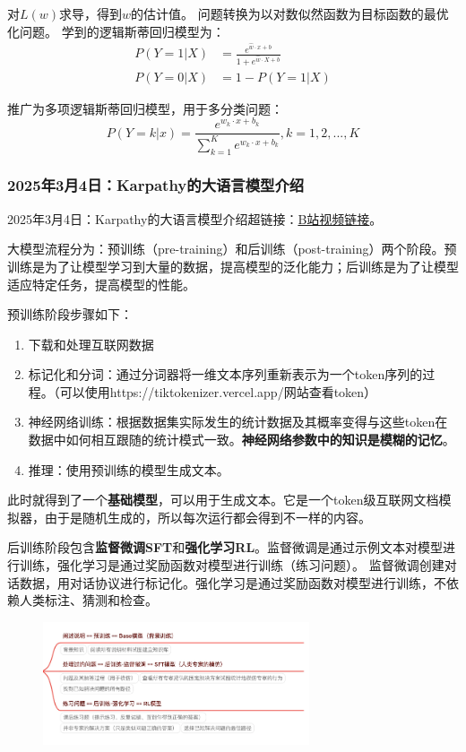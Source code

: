 \documentclass[12pt]{article}
\begin{document}
对$L(w)$求导，得到$w$的估计值。
问题转换为以对数似然函数为目标函数的最优化问题。
学到的逻辑斯蒂回归模型为：
\begin{align*}
    P(Y=1|X) &= \frac{ e^{\hat{w} \cdot x + b} }{1 + e^{\hat{w} \cdot X + b}} \\
    P(Y=0|X) &= 1 - P(Y=1|X)
\end{align*}

推广为多项逻辑斯蒂回归模型，用于多分类问题：
$$
P(Y=k|x) = \frac {e^{w_k \cdot x + b_k}}{\sum_{k=1}^{K} e^{w_k \cdot x + b_k}} , k = 1,2,...,K
$$

\subsubsection{2025年3月4日：Karpathy的大语言模型介绍}
2025年3月4日：Karpathy的大语言模型介绍超链接：\href{https://www.bilibili.com/video/BV16cNEeXEer/?spm_id_from=333.337.search-card.all.click&vd_source=13dfbe5ed2deada83969fafa995ccff6}{B站视频链接}。

大模型流程分为：预训练（pre-training）和后训练（post-training）两个阶段。预训练是为了让模型学习到大量的数据，提高模型的泛化能力；后训练是为了让模型适应特定任务，提高模型的性能。

预训练阶段步骤如下：
\begin{enumerate}
    \item 下载和处理互联网数据
    \item 标记化和分词：通过分词器将一维文本序列重新表示为一个token序列的过程。（可以使用https://tiktokenizer.vercel.app/网站查看token）
    \item 神经网络训练：根据数据集实际发生的统计数据及其概率变得与这些token在数据中如何相互跟随的统计模式一致。\textbf{神经网络参数中的知识是模糊的记忆}。
    \item 推理：使用预训练的模型生成文本。
\end{enumerate}
此时就得到了一个\textbf{基础模型}，可以用于生成文本。它是一个token级互联网文档模拟器，由于是随机生成的，所以每次运行都会得到不一样的内容。

后训练阶段包含\textbf{监督微调SFT}和\textbf{强化学习RL}。监督微调是通过示例文本对模型进行训练，强化学习是通过奖励函数对模型进行训练（练习问题）。
监督微调创建对话数据，用对话协议进行标记化。强化学习是通过奖励函数对模型进行训练，不依赖人类标注、猜测和检查。

\begin{figure}[h]
    \centering
    \includegraphics[width=0.7\textwidth]{./images/karpathyllm.png}
\end{figure}
\end{document}
